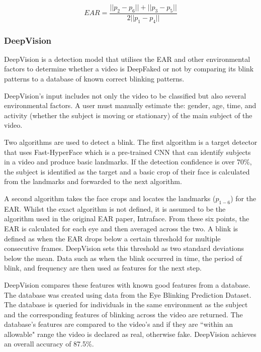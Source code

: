 \begin{equation}
    \label{eq:ear}
    EAR=\frac{||p_2-p_6|| + ||p_3-p_5||}{2||p_1-p_4||}
\end{equation}

\subsubsection{DeepVision}

DeepVision\cite{jung2020deepvision} is a detection model that utilises the EAR and other environmental factors to determine whether a video is DeepFaked or not by comparing its blink patterns to a database of known correct blinking patterns.

DeepVision's input includes not only the video to be classified but also several environmental factors. A user must manually estimate the: gender, age, time, and activity (whether the subject is moving or stationary) of the main subject of the video. 

Two algorithms are used to detect a blink. The first algorithm is a target detector that uses Fast-HyperFace\cite{ranjan2017hyperface} which is a pre-trained CNN that can identify subjects in a video and produce basic landmarks. If the detection confidence is over 70\%, the subject is identified as the target and a basic crop of their face is calculated from the landmarks and forwarded to the next algorithm.

A second algorithm takes the face crops and locates the landmarks ($p_{1-6}$) for the EAR. Whilst the exact algorithm is not defined, it is assumed to be the algorithm used in the original EAR paper, Intraface\cite{xiong2013supervised}. From these six points, the EAR is calculated for each eye and then averaged across the two. A blink is defined as when the EAR drops below a certain threshold for multiple consecutive frames. DeepVision sets this threshold as two standard deviations below the mean. Data such as when the blink occurred in time, the period of blink, and frequency are then used as features for the next step.

DeepVision compares these features with known good features from a database. The database was created using data from the Eye Blinking Prediction Dataset\cite{turing2018eye}. The database is queried for individuals in the same environment as the subject and the corresponding features of blinking across the video are returned. The database's features are compared to the video's and if they are ``within an allowable" range the video is declared as real, otherwise fake. DeepVision achieves an overall accuracy of 87.5\%.

